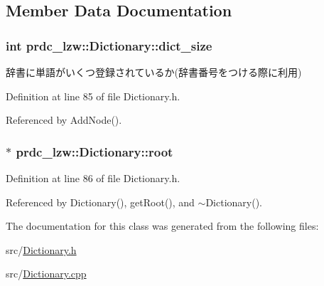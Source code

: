 \subsection{Member Data Documentation}
\hypertarget{classprdc__lzw_1_1Dictionary_ac96b4db6d4692ba9b082fe32e54bcf0d}{
\subsubsection[{dict\-\_\-size}]{\setlength{\rightskip}{0pt plus 5cm}int prdc\-\_\-lzw\-::\-Dictionary\-::dict\-\_\-size\hspace{0.3cm}{\ttfamily [private]}}}\label{classprdc__lzw_1_1Dictionary_ac96b4db6d4692ba9b082fe32e54bcf0d}


辞書に単語がいくつ登録されているか(辞書番号をつける際に利用) 



Definition at line 85 of file Dictionary.\-h.



Referenced by Add\-Node().

\hypertarget{classprdc__lzw_1_1Dictionary_a95b84d2d9ebb6277cfc6bffba5dee738}{
\subsubsection[{root}]{$\ast$ prdc\-\_\-lzw\-::\-Dictionary\-::root\hspace{0.3cm}{\ttfamily [private]}}}\label{classprdc__lzw_1_1Dictionary_a95b84d2d9ebb6277cfc6bffba5dee738}


Definition at line 86 of file Dictionary.\-h.



Referenced by Dictionary(), get\-Root(), and $\sim$\-Dictionary().



The documentation for this class was generated from the following files\-:\begin{DoxyCompactItemize}
\item 
src/\hyperlink{Dictionary_8h}{Dictionary.\-h}\item 
src/\hyperlink{Dictionary_8cpp}{Dictionary.\-cpp}\end{DoxyCompactItemize}
